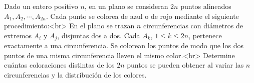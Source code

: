 Dado un entero positivo $n$, en un plano se consideran $2n$ puntos alineados $A_1, A_2, \cdots, A_{2n}$. Cada punto se colorea de azul o de rojo mediante el siguiente procedimiento:<br>
En el plano se trazan $n$ circunferencias con diámetros de extremos $A_i$ y $A_j$, disjuntas dos a dos. Cada $A_k$, $1 \leq k \leq 2n$, pertenece exactamente a una circunferencia. Se colorean los puntos de modo que los dos puntos de una misma circunferencia lleven el mismo color.<br>
Determine cuántas coloraciones distintas de los $2n$ puntos se pueden obtener al variar las $n$ circunferencias y la distribución de los colores.
